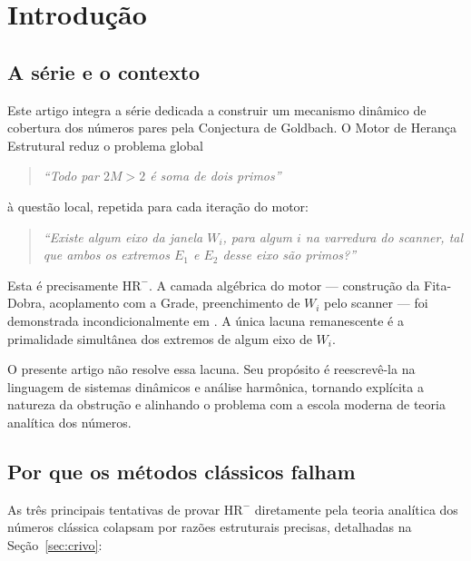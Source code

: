 \documentclass[12pt,a4paper]{article}
\theoremstyle{definition}
\newcommand{\HRm}{\mathrm{HR}^{-}}
\begin{document}
	\tableofcontents
	\newpage
	
	\section{Introdução}
	\label{sec:intro}
	
	\subsection{A série e o contexto}
	
	Este artigo integra a série \cite{goldbach1,grade,ancora,crivo_b,motor}
	dedicada a construir um mecanismo dinâmico de cobertura dos números pares
	pela Conjectura de Goldbach. O Motor de Herança Estrutural \cite{motor}
	reduz o problema global
	\begin{quote}
		\emph{``Todo par $2M > 2$ é soma de dois primos''}
	\end{quote}
	à questão local, repetida para cada iteração do motor:
	\begin{quote}
		\emph{``Existe algum eixo da janela $W_i$, para algum $i$ na
			varredura do scanner, tal que ambos os extremos $E_1$ e $E_2$
			desse eixo são primos?''}
	\end{quote}
	Esta é precisamente $\HRm$. A camada algébrica do motor —
	construção da Fita-Dobra, acoplamento com a Grade, preenchimento
	de $W_i$ pelo scanner — foi demonstrada incondicionalmente em
	\cite{motor}. A única lacuna remanescente é a primalidade
	simultânea dos extremos de algum eixo de $W_i$.
	
	O presente artigo não resolve essa lacuna. Seu propósito é
	reescrevê-la na linguagem de sistemas dinâmicos e análise
	harmônica, tornando explícita a natureza da obstrução e alinhando
	o problema com a escola moderna de teoria analítica dos números.
	
	\subsection{Por que os métodos clássicos falham}
	
	As três principais tentativas de provar $\HRm$ diretamente pela
	teoria analítica dos números clássica colapsam por razões
	estruturais precisas, detalhadas na Seção~\ref{sec:crivo}:
	
\end{document}
